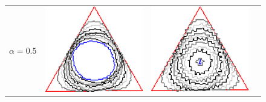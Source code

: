 \begin{figure}
\begin{tabular}{p{2.5em}ccc}
\multirow{2}{*}{$\alpha=0.5$}& \includegraphics[scale=0.25]{figures/chapter6/radius-effect/triangle/improve/len_pen0.5/radius-3/summary.pdf} &
\includegraphics[scale=0.23]{figures/chapter6/radius-effect/triangle/improve/len_pen0.5/radius-5/summary.pdf} &

\end{tabular}
\end{figure}
